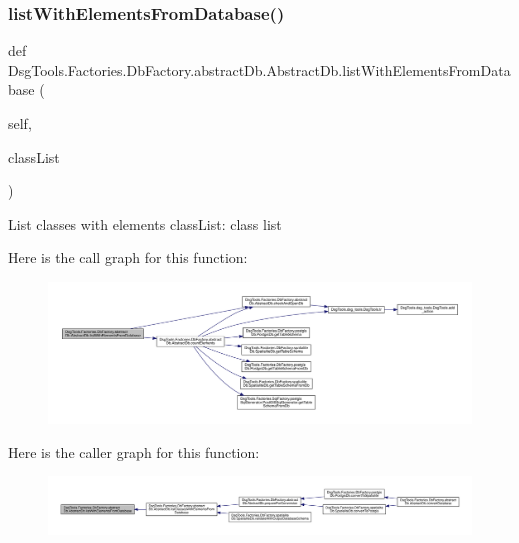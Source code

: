 \subsubsection{\texorpdfstring{list\+With\+Elements\+From\+Database()}{listWithElementsFromDatabase()}}
{\footnotesize\ttfamily def Dsg\+Tools.\+Factories.\+Db\+Factory.\+abstract\+Db.\+Abstract\+Db.\+list\+With\+Elements\+From\+Database (\begin{DoxyParamCaption}\item[{}]{self,  }\item[{}]{class\+List }\end{DoxyParamCaption})}

\begin{DoxyVerb}List classes with elements
classList: class list
\end{DoxyVerb}
 Here is the call graph for this function\+:
\nopagebreak
\begin{figure}[H]
\begin{center}
\leavevmode
\includegraphics[width=350pt]{class_dsg_tools_1_1_factories_1_1_db_factory_1_1abstract_db_1_1_abstract_db_ac6982cd90c216b936defc2ae530e41a1_cgraph}
\end{center}
\end{figure}
Here is the caller graph for this function\+:
\nopagebreak
\begin{figure}[H]
\begin{center}
\leavevmode
\includegraphics[width=350pt]{class_dsg_tools_1_1_factories_1_1_db_factory_1_1abstract_db_1_1_abstract_db_ac6982cd90c216b936defc2ae530e41a1_icgraph}
\end{center}
\end{figure}
\mbox{\label{class_dsg_tools_1_1_factories_1_1_db_factory_1_1abstract_db_1_1_abstract_db_a617875c72a962ca88ff79b8238f9a623}} 
